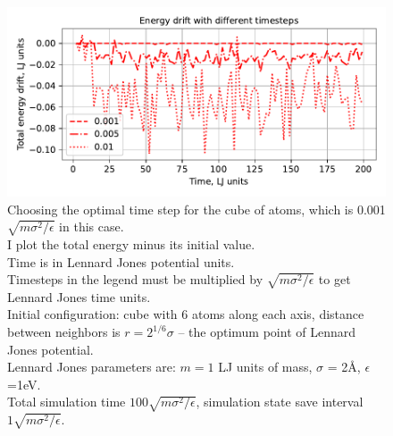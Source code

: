 \documentclass[12pt,a4paper]{article}
\begin{document}
\begin{figure}[h!]
	\centering
	\includegraphics[width=.7\linewidth]{img/milestone05-total.pdf}
	\caption{Choosing the optimal time step for the cube of atoms, which is 0.001 $\sqrt{m\sigma^2 / \epsilon}$ in this case.\\
		I plot the total energy minus its initial value.\\
		Time is in Lennard Jones potential units.\\
		Timesteps in the legend must be multiplied by $\sqrt{m\sigma^2 / \epsilon}$ to get Lennard Jones time units.\\
		Initial configuration: cube with 6 atoms along each axis, distance between neighbors is $r=2^{1/6}\sigma$ -- the optimum point of Lennard Jones potential.\\	
		Lennard Jones parameters are: $m=1$ LJ units of mass, $\sigma$ = 2Å, $\epsilon$=1eV.\\
		Total simulation time \( 100 \sqrt{m\sigma^2 / \epsilon} \), simulation state save interval \( 1 \sqrt{m\sigma^2 / \epsilon} \).}
	\label{fig:total_energy_check}
\end{figure}
\end{document}
